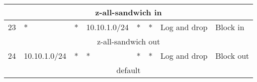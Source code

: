 \documentclass[a4paper, 11pt, oneside]{article}
\begin{document}
\begin{table}[H]
{\begin{tabular}{|llllllll|}
\multicolumn{8}{|c|}{{\color[HTML]{FE0000} z-all-sandwich in}}                                                                                                                                                                                                                                                                                                                                                                                                                                                                         \\ \hline
\multicolumn{1}{|l|}{23}                        & \multicolumn{1}{l|}{*}                                                            & \multicolumn{1}{l|}{*}                                                              & \multicolumn{1}{l|}{10.10.1.0/24}                                                      & \multicolumn{1}{l|}{*}                                                                   & \multicolumn{1}{l|}{*}                 & \multicolumn{1}{l|}{Log and drop}    & Block in                               \\ \hline
\multicolumn{8}{|c|}{{\color[HTML]{FE0000} z-all-sandwich out}}                                                                                                                                                                                                                                                                                                                                                                                                                                                                        \\ \hline
\multicolumn{1}{|l|}{24}                        & \multicolumn{1}{l|}{10.10.1.0/24}                                                 & \multicolumn{1}{l|}{*}                                                              & \multicolumn{1}{l|}{*}                                                                 & \multicolumn{1}{l|}{*}                                                                   & \multicolumn{1}{l|}{*}                 & \multicolumn{1}{l|}{Log and drop}    & Block out                              \\ \hline
\multicolumn{8}{|c|}{{\color[HTML]{FE0000} default}}                                                                                                                                                                                                                                                                                                                                                                                                                                                                                   \\ \hline

\end{tabular}}
\end{table}
\end{document}
